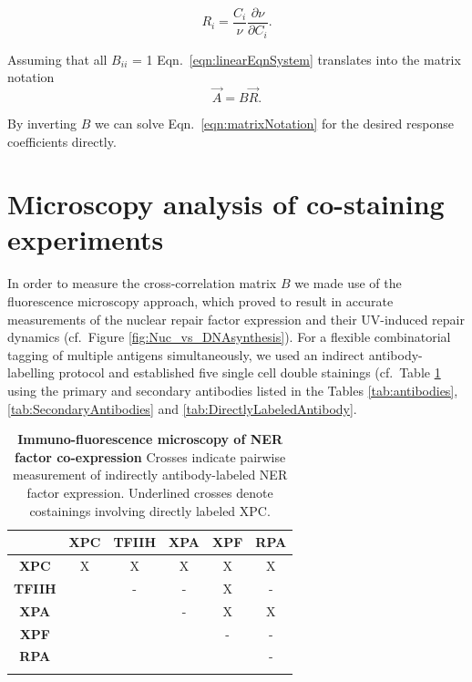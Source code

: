 \begin{equation}
R_i = \frac{C_i}{\nu}\frac{\partial \nu}{\partial C_i}.
\label{eqn:responseCoefficientsII}
\end{equation}

Assuming that all $B_{ii}$ = 1 Eqn.\ \ref{eqn:linearEqnSystem} translates into the matrix notation 
\begin{equation}
\vec{A} = B\vec{R}.
\label{eqn:matrixNotation}
\end{equation}

By inverting $B$ we can solve Eqn.\ \ref{eqn:matrixNotation} for the desired response coefficients directly. 


\section{Microscopy analysis of co-staining experiments}

In order to measure the cross-correlation matrix $B$ we made use of the fluorescence microscopy approach, which proved to result in accurate measurements of the nuclear repair factor expression and their UV-induced repair dynamics (cf.\ Figure \ref{fig:Nuc_vs_DNAsynthesis}). For a flexible combinatorial tagging of multiple antigens simultaneously, we used an indirect antibody-labelling protocol and established five single cell double stainings (cf.\ Table \ref{tab:co-staining} using the primary and secondary antibodies listed in the Tables \ref{tab:antibodies}, \ref{tab:SecondaryAntibodies} and \ref{tab:DirectlyLabeledAntibody}. 


\begin{table}[h!]
	\centering
	\begin{tabular}{cccccc}
		\hline
			\rule{0pt}{2ex}
			&\textbf{XPC} & \textbf{TFIIH} & \textbf{XPA} & \textbf{XPF} & \textbf{RPA}\\ \hline
			\rule{0pt}{3ex}
\textbf{XPC}&        X    &           X    & X            &         X    & X            \\ \hline
			\rule{0pt}{3ex}
\textbf{TFIIH}&           & -              & -            & X            & -             \\ \hline
			\rule{0pt}{3ex}
\textbf{XPA}&             &                & -            & X            & X             \\ \hline
			\rule{0pt}{3ex}
\textbf{XPF}&             &                &              & -            & -              \\ \hline
			\rule{0pt}{3ex}
\textbf{RPA}&             &                &              &              & -               \\ \hline
			\rule{0pt}{3ex}
		
	\end{tabular}
	\caption{\textbf{Immuno-fluorescence microscopy of NER factor co-expression} Crosses indicate pairwise measurement of indirectly antibody-labeled NER factor expression. Underlined crosses denote costainings involving directly labeled XPC. }\label{tab:co-staining}
\end{table}   


